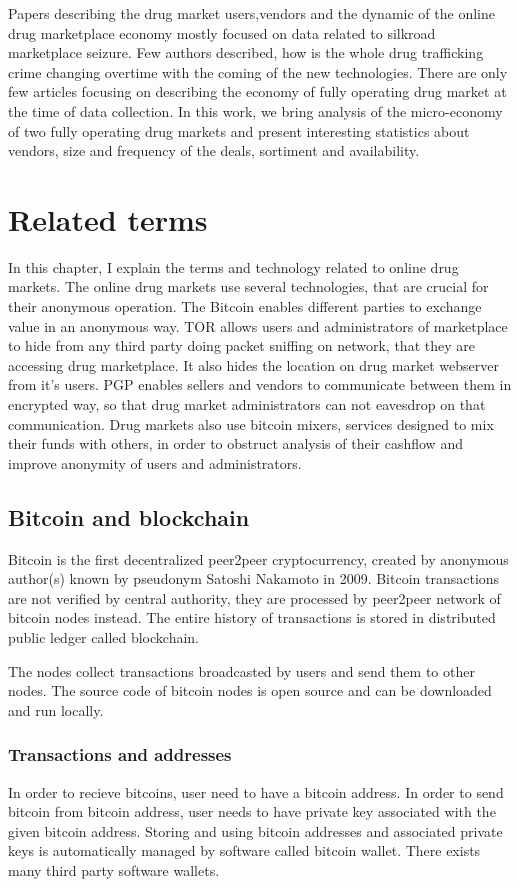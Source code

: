 \documentclass[
  digital, %
  table,   %
  lof,     %
  lot,     %
  oneside
]{fithesis3}
\begin{document}
Papers describing the drug market users,vendors and the dynamic of
the online drug marketplace economy mostly focused on data related to silkroad marketplace seizure. 
Few authors described, how is the whole drug trafficking crime changing overtime with the coming of the new technologies.
There are only few articles focusing on describing the economy of fully operating drug market at the time of data collection.
In this work, we bring analysis of the micro-economy of two fully operating drug markets and present interesting statistics about vendors,
size and frequency of the deals, sortiment and availability.

\chapter{Related terms}

In this chapter, I explain the terms and technology related to online drug markets.
The online drug markets use several technologies, that are crucial for their anonymous operation.
The Bitcoin enables different parties to exchange value in an anonymous way.
TOR allows users and administrators of marketplace to hide from any third party doing packet sniffing on network,
that they are accessing drug marketplace. It also hides the location on drug market webserver from it's users.
PGP enables sellers and vendors to communicate between them in encrypted way,
so that drug market administrators can not eavesdrop on that communication.
Drug markets also use bitcoin mixers, services designed to mix their funds with others, in order to obstruct
analysis of their cashflow and improve anonymity of users and administrators.

\section{Bitcoin and blockchain}

Bitcoin is  the first decentralized peer2peer cryptocurrency, created by anonymous author(s) known by pseudonym Satoshi Nakamoto in 2009.
Bitcoin transactions are not verified by central authority, they are  
processed by peer2peer network of bitcoin nodes instead. 
The entire history of transactions is stored in distributed public ledger called blockchain.

The nodes collect transactions broadcasted by users and send them to other nodes.
The source code of bitcoin nodes is open source and can be downloaded and run locally. 

\subsection{Transactions and addresses}
In order to recieve bitcoins, user need to have a bitcoin address. In order to send bitcoin from bitcoin address,
 user needs to have private key associated with the given bitcoin address.
Storing and using bitcoin addresses and associated private keys is automatically managed
by software called bitcoin wallet. There exists many third party software wallets.
\end{document}
